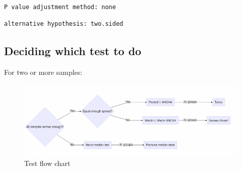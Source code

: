 \documentclass[
  letterpaper,
  DIV=11,
  numbers=noendperiod]{scrartcl}
\begin{document}
\begin{verbatim}

P value adjustment method: none
\end{verbatim}

\begin{verbatim}
alternative hypothesis: two.sided
\end{verbatim}

\hypertarget{deciding-which-test-to-do}{%
\subsection{Deciding which test to do}\label{deciding-which-test-to-do}}

For two or more samples:

\begin{figure}

{\centering \includegraphics{testflow.png}

}

\caption{Test flow chart}

\end{figure}
\end{document}
